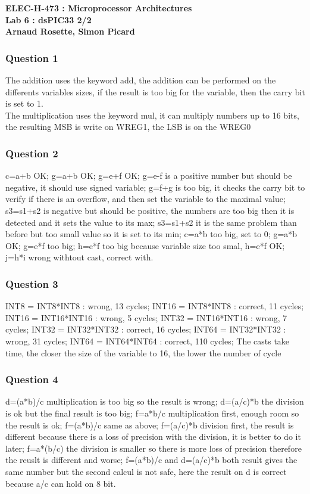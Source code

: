 \documentclass[a4paper,10pt]{article}
\begin{document}
\begin{center}
\textbf{ELEC-H-473 : Microprocessor Architectures\\ Lab 6 : dsPIC33 2/2\\Arnaud Rosette, Simon Picard}
\end{center}

\subsubsection*{Question 1}
The addition uses the keyword add, the addition can be performed on the differents variables sizes, if the result is too big for the variable, then the carry bit is set to 1.\\
The multiplication uses the keyword mul, it can multiply numbers up to 16 bits, the resulting MSB is write on WREG1, the LSB is on the WREG0

\subsubsection*{Question 2}
c=a+b OK; g=a+b OK; g=e+f OK; g=e-f is a positive number but should be negative, it should use signed variable; g=f+g is too big, it checks the carry bit to verify if there is an overflow, and then set the variable to the maximal value; s3=s1+s2 is negative but should be positive, the numbers are too big then it is detected and it sets the value to its max; s3=s1+s2 it is the same problem than before but too small value so it is set to its min; c=a*b too big, set to 0; g=a*b OK; g=e*f too big; h=e*f too big because variable size too smal, h=e*f OK; j=h*i wrong withtout cast, correct with.

\subsubsection*{Question 3}
INT8 = INT8*INT8 : wrong, 13 cycles; 
INT16 = INT8*INT8 : correct, 11 cycles; 
INT16 = INT16*INT16 : wrong, 5 cycles; 
INT32 = INT16*INT16 : wrong, 7 cycles; 
INT32 = INT32*INT32 : correct, 16 cycles; 
INT64 = INT32*INT32 : wrong, 31 cycles; 
INT64 = INT64*INT64 : correct, 110 cycles; 
The casts take time, the closer the size of the variable to 16, the lower the number of cycle

\subsubsection*{Question 4}
d=(a*b)/c multiplication is too big so the result is wrong; 
d=(a/c)*b the division is ok but the final result is too big; 
f=a*b/c multiplication first, enough room so the result is ok; 
f=(a*b)/c same as above; 
f=(a/c)*b division first, the result is different because there is a loss of precision with the division, it is better to do it later; 
f=a*(b/c) the division is smaller so there is more loss of precision therefore the reuslt is different and worse; 
f=(a*b)/c and 
d=(a/c)*b both result gives the same number but the second calcul is not safe, here the result on d is correct because a/c can hold on 8 bit.
    
\end{document}
